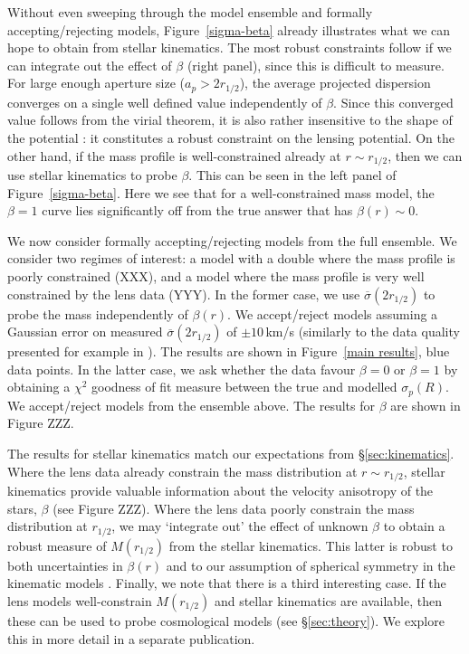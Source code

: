 \documentclass[galley,usenatbib]{mn2e}
\newcommand{\figref}[1] {Figure~\ref{#1}}
\begin{document}
Without even sweeping through the model ensemble and formally
accepting/rejecting models, \figref{sigma-beta} already illustrates what we can
hope to obtain from stellar kinematics. The most robust constraints follow if
we can integrate out the effect of $\beta$ (right panel), since this is
difficult to measure. For large enough aperture size ($a_p > 2r_{1/2}$), the
average projected dispersion converges on a single well defined value
independently of $\beta$. Since this converged value follows from the virial
theorem, it is also rather insensitive to the shape of the potential
\citep{2012ApJ...754L..39A}: it constitutes a robust constraint on the lensing
potential. On the other hand, if the mass profile is well-constrained already
at $r \sim r_{1/2}$, then we can use stellar kinematics to probe $\beta$. This
can be seen in the left panel of \figref{sigma-beta}. Here we see that for a
well-constrained mass model, the $\beta = 1$ curve lies significantly off from
the true answer that has $\beta(r) \sim 0$. 

We now consider formally accepting/rejecting models from the full ensemble. We
consider two regimes of interest: a model with a double where the mass profile
is poorly constrained (XXX), and a model where the mass profile is very well
constrained by the lens data (YYY). In the former case, we use
$\overline{\sigma}(2 r_{1/2})$ to probe the mass independently of $\beta(r)$.
We accept/reject models assuming a Gaussian error on measured
$\overline{\sigma}(2 r_{1/2})$ of $\pm 10$\,km/s (similarly to the data quality
presented for example in \citealt{2002MNRAS.337L...6T}). The results are shown
in \figref{main results}, blue data points. In the latter case, we ask whether
the data favour $\beta = 0$ or $\beta = 1$ by obtaining a $\chi^2$ goodness of
fit measure between the true and modelled $\sigma_p(R)$. We accept/reject
models from the ensemble above. The results for $\beta$ are shown in Figure
ZZZ. 

The results for stellar kinematics match our expectations from
\S\ref{sec:kinematics}. Where the lens data already constrain the mass
distribution at $r \sim r_{1/2}$, stellar kinematics provide valuable
information about the velocity anisotropy of the stars, $\beta$ (see Figure
ZZZ). Where the lens data poorly constrain the mass distribution at $r_{1/2}$,
we may `integrate out' the effect of unknown $\beta$ to obtain a robust measure
of $M(r_{1/2})$ from the stellar kinematics. This latter is robust to both
uncertainties in $\beta(r)$ and to our assumption of spherical symmetry in the
kinematic models \citep{2012ApJ...754L..39A}. Finally, we note that there is a
third interesting case. If the lens models well-constrain $M(r_{1/2})$ and
stellar kinematics are available, then these can be used to probe cosmological
models (see \S\ref{sec:theory}). We explore this in more detail in a separate
publication. 
\end{document}
